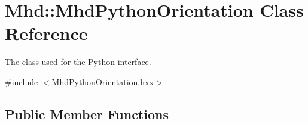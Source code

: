 \hypertarget{classMhd_1_1MhdPythonOrientation}{\section{\-Mhd\-:\-:\-Mhd\-Python\-Orientation \-Class \-Reference}
\label{classMhd_1_1MhdPythonOrientation}
}


\-The class used for the \-Python interface.  




{\ttfamily \#include $<$\-Mhd\-Python\-Orientation.\-hxx$>$}

\subsection*{\-Public \-Member \-Functions}
